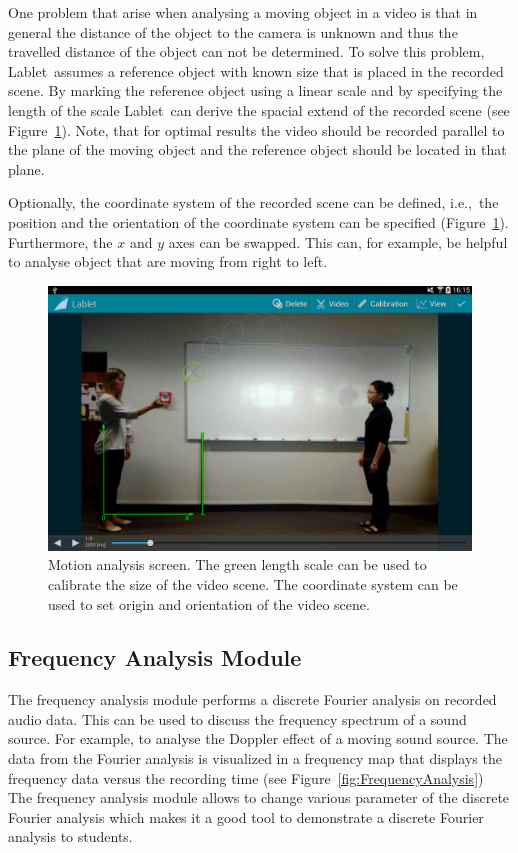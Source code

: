 \documentclass{sigchi}
\newcommand{\ie}{i.e.,\ }
\newcommand{\lablet}{Lablet\ }
\begin{document}
One problem that arise when analysing a moving object in a video is that in general the distance of the object to the camera is unknown and thus the travelled distance of the object can not be determined.
To solve this problem, \lablet assumes a reference object with known size that is placed in the recorded scene.
By marking the reference object using a linear scale and by specifying the length of the scale \lablet can derive the spacial extend of the recorded scene (see Figure~\ref{fig:MotionAnalysis}).
Note, that for optimal results the video should be recorded parallel to the plane of the moving object and the reference object should be located in that plane.

Optionally, the coordinate system of the recorded scene can be defined, \ie the position and the orientation of the coordinate system can be specified (Figure~\ref{fig:MotionAnalysis}).
Furthermore, the $x$ and $y$ axes can be swapped.
This can, for example, be helpful to analyse object that are moving from right to left.

\begin{figure}
  \centering
  \includegraphics[width=.99\columnwidth]{MotionAnalysis}
  \caption{Motion analysis screen.
  The green length scale can be used to calibrate the size of the video scene.
  The coordinate system can be used to set origin and orientation of the video scene.\label{fig:MotionAnalysis}}
\end{figure}

\subsection{Frequency Analysis Module}
The frequency analysis module performs a discrete Fourier analysis on recorded audio data.
This can be used to discuss the frequency spectrum of a sound source.
For example, to analyse the Doppler effect of a moving sound source.
The data from the Fourier analysis is visualized in a frequency map that displays the frequency data versus the recording time (see Figure~\ref{fig:FrequencyAnalysis})
The frequency analysis module allows to change various parameter of the discrete Fourier analysis which makes it a good tool to demonstrate a discrete Fourier analysis to students.
\end{document}
